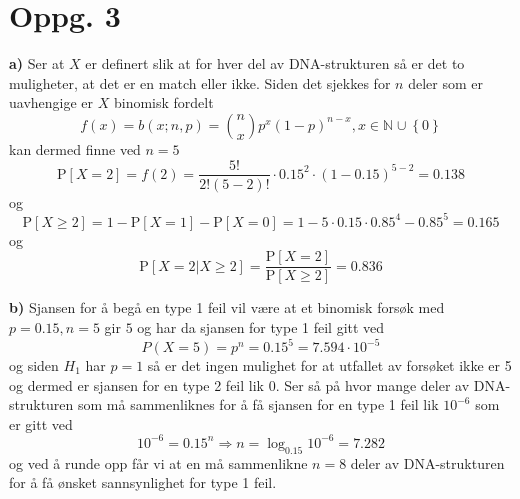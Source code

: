 \documentclass{report}
\newcommand{\M}[2]{\mathbb{#1}^{#2}}
\newcommand{\bbrack}[1]{\left[ #1 \right]}
\newcommand{\cbrack}[1]{\left\lbrace #1 \right\rbrace}
\newcommand{\Prob}[1]{\text{P} \bbrack{ #1 }}
\begin{document}
\section*{Oppg. 3}
\textbf{a)}
Ser at $X$ er definert slik at for hver del av DNA-strukturen så er det to muligheter, at det er en match eller ikke. Siden det sjekkes for $n$ deler som er uavhengige er $X$ binomisk fordelt
\begin{equation}
  \label{eq:4}
  f(x) = b(x; n, p) = \binom{n}{x} p^{x}(1-p)^{n-x}, x \in \M{N}{} \cup \cbrack{0}
\end{equation}
kan dermed finne ved $n=5$
\begin{equation}
  \label{eq:14}
  \Prob{X=2} = f(2) = \frac{5!}{2!(5-2)!} \cdot 0.15^{2} \cdot (1-0.15)^{5-2} = 0.138
\end{equation}
og
\begin{equation}
  \label{eq:15}
  \Prob{X \geq 2} = 1 - \Prob{X=1} - \Prob{X=0} = 1 - 5\cdot 0.15 \cdot 0.85^{4} - 0.85^{5} = 0.165
\end{equation}
og
\begin{equation}
  \label{eq:16}
  \Prob{X = 2 | X \geq 2} = \frac{\Prob{X=2}}{\Prob{X \geq 2}} = 0.836
\end{equation}

\textbf{b)}
Sjansen for å begå en type 1 feil vil være at et binomisk forsøk med $p = 0.15, n = 5$ gir $5$ og har da sjansen for type 1 feil gitt ved
\begin{equation}
  \label{eq:32}
  P(X = 5) = p^{n} = 0.15^{5} = 7.594 \cdot 10^{-5}
\end{equation}
og siden $H_{1}$ har $p=1$ så er det ingen mulighet for at utfallet av forsøket ikke er 5 og dermed er sjansen for en type 2 feil lik 0. Ser så på hvor mange deler av DNA-strukturen som må sammenliknes for å få sjansen for en type 1 feil lik $10^{-6}$ som er gitt ved
\begin{equation}
  \label{eq:33}
  10^{-6} = 0.15^{n} \Rightarrow n = \log_{0.15}10^{-6} = 7.282
\end{equation}
og ved å runde opp får vi at en må sammenlikne $n = 8$ deler av DNA-strukturen for å få ønsket sannsynlighet for type 1 feil.
\end{document}
